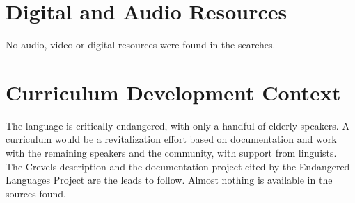 \documentclass[12pt]{article}
\begin{document}
\section{Digital and Audio Resources}
No audio, video or digital resources were found in the searches.

\section{Curriculum Development Context}
The language is critically endangered, with only a handful of elderly speakers. A curriculum would be a revitalization effort based on documentation and work with the remaining speakers and the community, with support from linguists. The Crevels description and the documentation project cited by the Endangered Languages Project are the leads to follow. Almost nothing is available in the sources found.
\end{document}
